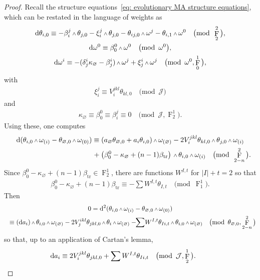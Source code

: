 \documentclass[pdftex]{sigma}
\DeclareMathOperator{\tr}{tr}
\renewcommand{\d}{{\rm d}}
\renewcommand{\mod}[1]{\quad\big(\mathrm{mod\enspace} #1\big)}
\newcommand{\w}{{\mathchoice{\,{\scriptstyle\wedge}\,}{{\scriptstyle\wedge}}
 {{\scriptscriptstyle\wedge}}{{\scriptscriptstyle\wedge}}}}
\newcommand{\thetas}[1]{\theta_{#1}}
\newcommand{\thetanot}{\thetas{\varnothing,0}}
\newcommand{\omegas}[1]{\omega_{(#1)}}
\DeclareMathOperator{\pwf}{F}
\newcommand{\cartTheta}{\mathcal{J}}
\numberwithin{equation}{section}
\begin{document}
\begin{proof}
Recall the structure equations~\eqref{eq: evolutionary MA structure equations}, which can be restated in the language of weights as
\begin{gather*}
\d\thetas{i,0} \equiv -\beta_i^j\w\thetas{j,0} - \xi_i^j\w\thetas{j,0} - \thetas{ij,0}\w\omega^j - \thetas{i,1}\w\omega^0 \mod{\pwf^2_2},\\
\d\omega^0 \equiv \beta_0^0\w\omega^0 \mod{\omega^0 }, \\
\d\omega^i \equiv - (\delta^i_j\kappa_{\varnothing} - \beta^i_j)\w\omega^j + \xi^i_j\w\omega^j \mod{\omega^0, \pwf^1_0} ,
\end{gather*}
with
\begin{gather*}
\xi_i^j \equiv V_i^{jkl}\thetas{kl,0} \mod{\cartTheta}
\end{gather*}
and
\begin{gather*}
\kappa_\varnothing \equiv \beta_0^0 \equiv \beta_i^j \equiv 0 \mod{\cartTheta, \pwf^1_2} .
\end{gather*}
Using these, one computes
\begin{gather*}
 \d(\thetas{i,0}\w\omegas{i} - \thetanot\w\omegas{0})
 \equiv (a_\varnothing\thetanot + a_i\thetas{i,0})\w\omegas{\varnothing} - 2V_i^{jkl}\thetas{kl,0}\w\thetas{j,0}\w\omegas{i}
 \\ \hphantom{ \d(\thetas{i,0}\w\omegas{i} - \thetanot\w\omegas{0}) \equiv }
 {} + \left(\beta_0^0 -\kappa_{\varnothing} + (n-1)\beta_{\tr}\right)\w\thetas{i,0}\w\omegas{i} \mod{\pwf^2_{2-n}}.
\end{gather*}
Since $\beta_0^0 -\kappa_{\varnothing} + (n-1)\beta_{\tr} \in \pwf^1_2$, there are functions $W^{I,t}$ for $|I|+t = 2$ so that
\begin{gather*}
\beta_0^0 -\kappa_{\varnothing} + (n-1)\beta_{\tr} \equiv -\sum W^{I,t}\thetas{I,t} \mod{\pwf^1_1} .
\end{gather*}
Then
\begin{gather*}
 0 = \d^2(\thetas{i,0}\w\omegas{i} - \thetanot\w\omegas{0})
 \\ \hphantom{ 0 }
 {}\equiv (\d a_i)\w\thetas{i,0}\w\omegas{\varnothing} - 2V_j^{ikl}\thetas{jkl,0}\w\thetas{i}\w\omegas{\varnothing}
 -\!\! \sum\! W^{I,t}\thetas{Ii,t}\w\thetas{i,0}\w\omegas{\varnothing}\mod{\thetanot, \pwf^2_{2-n}}
\end{gather*}
so that, up to an application of Cartan's lemma,
\begin{gather*}
\d a_i \equiv 2V_i^{jkl}\thetas{jkl,0} + \sum W^{I,t}\thetas{Ii,t} \mod{\cartTheta, \pwf^1_2} .
\tag*{\qed}
\end{gather*}
\renewcommand{\qed}{}
\end{proof}
\end{document}
